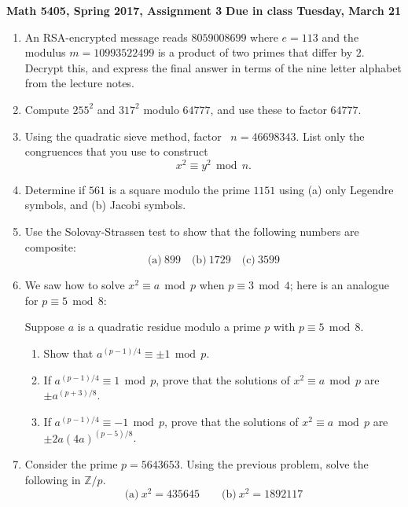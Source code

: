 \documentclass{article}
\renewcommand{\mod}{\,\operatorname{mod}\,}
\def\ZZ{{\mathbb Z}}
\begin{document}
\noindent\textbf{Math 5405, Spring 2017, Assignment 3} \hfill \textbf{Due in class Tuesday, March 21}
\bigskip

\begin{enumerate}

\item An RSA-encrypted message reads $8059008699$ where $e=113$ and the modulus $m=10993522499$ is a product of two primes that differ by $2$. Decrypt this, and express the final answer in terms of the nine letter alphabet from the lecture notes.

\item Compute $255^2$ and $317^2$ modulo $64777$, and use these to factor $64777$.

\item Using the quadratic sieve method, factor \ $n=46698343$. List only the congruences that you use to construct
\[
x^2\equiv y^2\mod n.
\]

\item Determine if $561$ is a square modulo the prime $1151$ using (a) only Legendre symbols, and (b) Jacobi symbols.

\item Use the Solovay-Strassen test to show that the following numbers are composite:
\[
\text{(a)}\ 899\quad\text{(b)}\ 1729\quad\text{(c)}\ 3599
\]

\item We saw how to solve $x^2\equiv a\mod p$ when $p\equiv3\mod 4$; here is an analogue for $p\equiv5\mod 8$:

Suppose $a$ is a quadratic residue modulo a prime $p$ with $p\equiv 5\mod 8$.
\begin{enumerate}
\item Show that $a^{(p-1)/4}\equiv\pm1\mod p$.
\item If $a^{(p-1)/4}\equiv1\mod p$, prove that the solutions of $x^2\equiv a\mod p$ are $\pm a^{(p+3)/8}$.
\item If $a^{(p-1)/4}\equiv-1\mod p$, prove that the solutions of $x^2\equiv a\mod p$ are $\pm 2a (4a)^{(p-5)/8}$.
\end{enumerate}

\item Consider the prime $p=5643653$. Using the previous problem, solve the following in $\ZZ/p$.
\[
\text{(a)}\ x^2=435645\qquad\text{(b)}\ x^2=1892117
\]


\end{enumerate}
\end{document}
